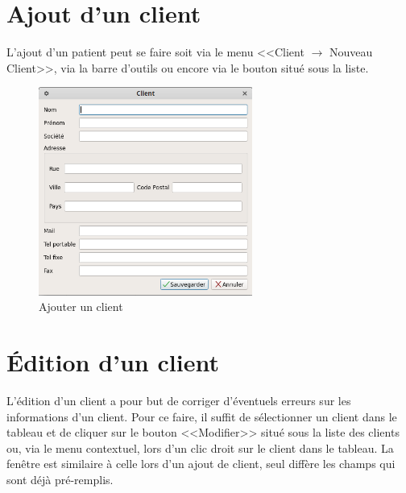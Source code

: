 \section{Ajout d'un client}
L'ajout d’un patient peut se faire soit via le menu <<Client $\rightarrow$ Nouveau Client>>, via la barre d'outils ou encore via le bouton situé sous la
liste. 
\begin{figure}[H]
	\centering
	\includegraphics[width=7cm]{screens/ajouterClient.png}
	\caption{Ajouter un client}
\end{figure}

\section{Édition d'un client}
L’édition d’un client a pour but de corriger d’éventuels erreurs sur les informations d’un client. Pour ce faire, il suffit de sélectionner
un client dans le tableau et de cliquer sur le bouton <<Modifier>> situé sous la liste des clients ou, via le menu contextuel, lors d’un clic
droit sur le client dans le tableau. 
 La fenêtre est similaire à celle lors d’un ajout de client, seul diffère les champs qui sont déjà pré-remplis. 

